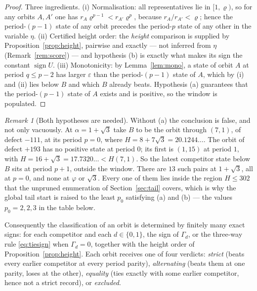 \documentclass[11pt]{article}
\theoremstyle{definition}
\theoremstyle{remark}
\newtheorem{remark}[theorem]{Remark}
\newcommand{\pr}{\varrho}
\newcommand{\gam}{\Gamma}
\DeclareMathOperator{\sgn}{sign}
\begin{document}
\begin{proof}
Three ingredients. (i) Normalisation: all representatives lie in $[1,\pr)$, so for any orbits
$A,A'$ one has $r_A\pr^{p-1}<r_{A'}\pr^{p}$, because $r_A/r_{A'}<\pr$; hence the period-$(p-1)$
state of any orbit precedes the period-$p$ state of any other in the variable $\eta$.
(ii) Certified height order: the \emph{height} comparison is supplied by
Proposition~\ref{prop:height}, pairwise and exactly --- not inferred from $\eta$
(Remark~\ref{rem:score}) --- and hypothesis (b) is exactly what makes its sign the constant
$\sgn U$. (iii) Monotonicity: by Lemma~\ref{lem:mono}, a state of orbit $A$ at period
$q\le p-2$ has larger $\varepsilon$ than the period-$(p-1)$ state of $A$, which by (i) and (ii)
lies below $B$ and which $B$ already beats. Hypothesis (a) guarantees that the period-$(p-1)$
state of $A$ exists and is positive, so the window is populated.
\end{proof}

\begin{remark}[Both hypotheses are needed]\label{rem:windowfails}
Without (a) the conclusion is false, and not only vacuously. At $\alpha=1+\sqrt3$ take $B$ to
be the orbit through $(7,1)$, of defect $-111$, at its period $p=0$, where
$H=8+7\sqrt3=20.1244\ldots$. The orbit of defect $+193$ has no positive state at period $0$;
its first is $(1,15)$ at period $1$, with $H=16+\sqrt3=17.7320\ldots<H(7,1)$. So the latest
competitor state below $B$ sits at period $p+1$, outside the window. There are $13$ such pairs
at $1+\sqrt3$, all at $p=0$, and none at $\varphi$ or $\sqrt3$. Every one of them lies inside
the region $H\le302$ that the unpruned enumeration of Section~\ref{sec:tail} covers, which is
why the global tail start is raised to the least $p_0$ satisfying (a) and (b) --- the values
$p_0=2,2,3$ in the table below.
\end{remark}

Consequently the classification of an orbit is determined by finitely many exact signs: for each
competitor and each $d\in\{0,1\}$, the sign of $\gam_d$, or the three-way rule
\eqref{eq:tiesign} when $\gam_d=0$, together with the height order of
Proposition~\ref{prop:height}. Each orbit receives one of four verdicts:
\emph{strict} (beats every earlier competitor at every period parity), \emph{alternating}
(beats them at one parity, loses at the other), \emph{equality} (ties exactly with some earlier
competitor, hence not a strict record), or \emph{excluded}.
\end{document}
